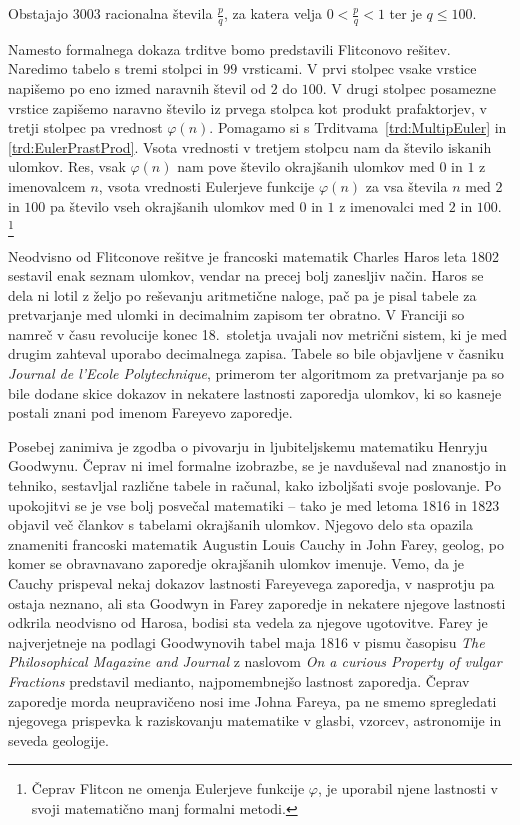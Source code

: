 \documentclass[mat1]{fmfdelo}
\begin{document}
\begin{trditev}
Obstajajo $3003$ racionalna števila $\frac{p}{q}$, za katera velja $0<\frac{p}{q}<1$ ter je $q \leq 100$.
\end{trditev}

Namesto formalnega dokaza trditve bomo predstavili Flitconovo rešitev. Naredimo tabelo s tremi stolpci in $99$ vrsticami. V prvi stolpec vsake vrstice napišemo po eno izmed naravnih števil od $2$ do $100$. V drugi stolpec posamezne vrstice zapišemo naravno število iz prvega stolpca kot produkt prafaktorjev, v tretji stolpec pa vrednost $\varphi(n)$. Pomagamo si s Trditvama~\ref{trd:MultipEuler} in \ref{trd:EulerPrastProd}. Vsota vrednosti v tretjem stolpcu nam da število iskanih ulomkov. Res, vsak $\varphi(n)$ nam pove število okrajšanih ulomkov med $0$ in $1$ z imenovalcem $n$, vsota vrednosti Eulerjeve funkcije $\varphi(n)$ za vsa števila $n$ med $2$ in $100$ pa število vseh okrajšanih ulomkov med $0$ in $1$ z imenovalci med $2$ in $100$. \footnote{Čeprav Flitcon ne omenja Eulerjeve funkcije $\varphi$, je uporabil njene lastnosti v svoji matematično manj formalni metodi.}

Neodvisno od Flitconove rešitve je francoski matematik Charles Haros leta 1802 sestavil enak seznam ulomkov, vendar na precej bolj zanesljiv način. Haros se dela ni lotil z željo po reševanju aritmetične naloge, pač pa je pisal tabele za pretvarjanje med ulomki in decimalnim zapisom ter obratno. V Franciji so namreč v času revolucije konec 18.~stoletja uvajali nov metrični sistem, ki je med drugim zahteval uporabo decimalnega zapisa. Tabele so bile objavljene v časniku \emph{Journal de l'Ecole Polytechnique}, primerom ter algoritmom za pretvarjanje pa so bile dodane skice dokazov in nekatere lastnosti zaporedja ulomkov, ki so kasneje postali znani pod imenom Fareyevo zaporedje. 

Posebej zanimiva je zgodba o pivovarju in ljubiteljskemu matematiku Henryju Goodwynu. Čeprav ni imel formalne izobrazbe, se je navduševal nad znanostjo in tehniko, sestavljal različne tabele in računal, kako izboljšati svoje poslovanje. Po upokojitvi se je vse bolj posvečal matematiki -- tako je med letoma 1816 in 1823 objavil več člankov s tabelami okrajšanih ulomkov. Njegovo delo sta opazila znameniti francoski matematik Augustin Louis Cauchy in John Farey, geolog, po komer se obravnavano zaporedje okrajšanih ulomkov imenuje. Vemo, da je Cauchy prispeval nekaj dokazov lastnosti Fareyevega zaporedja, v nasprotju pa ostaja neznano, ali sta Goodwyn in Farey zaporedje in nekatere njegove lastnosti odkrila neodvisno od Harosa, bodisi sta vedela za njegove ugotovitve. Farey je najverjetneje na podlagi Goodwynovih tabel maja 1816 v pismu časopisu \emph{The Philosophical Magazine and Journal} z naslovom \emph{On a curious Property of vulgar Fractions} predstavil medianto, najpomembnejšo lastnost zaporedja. Čeprav zaporedje morda neupravičeno nosi ime Johna Fareya, pa ne smemo spregledati njegovega prispevka k raziskovanju matematike v glasbi, vzorcev, astronomije in seveda geologije.
\end{document}
